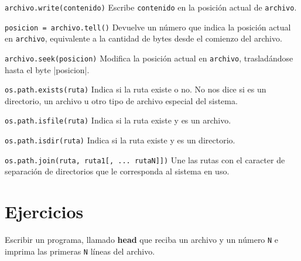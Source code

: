 \begin{referencia_python}
\begin{sintaxis}{\lstinline!archivo.write(contenido)!}
Escribe \lstinline!contenido! en la posición actual de \lstinline!archivo!.
\end{sintaxis}

\begin{sintaxis}{\lstinline!posicion = archivo.tell()!}
Devuelve un número que indica la posición actual en \lstinline!archivo!,
equivalente a la cantidad de bytes desde el comienzo del archivo.
\end{sintaxis}

\begin{sintaxis}{\lstinline!archivo.seek(posicion)!}
Modifica la posición actual en \lstinline!archivo!, trasladándose
hasta el byte |posicion|.
\end{sintaxis}

\begin{sintaxis}{\lstinline!os.path.exists(ruta)!}
Indica si la ruta existe o no.
No nos dice si es un directorio, un archivo u otro tipo de archivo especial
del sistema.
\end{sintaxis}

\begin{sintaxis}{\lstinline!os.path.isfile(ruta)!}
Indica si la ruta existe y es un archivo.
\end{sintaxis}

\begin{sintaxis}{\lstinline!os.path.isdir(ruta)!}
Indica si la ruta existe y es un directorio.
\end{sintaxis}

\begin{sintaxis}{\lstinline!os.path.join(ruta, ruta1[, ... rutaN]])!}
Une las rutas con el caracter de separación de directorios que le corresponda
al sistema en uso.
\end{sintaxis}

\end{referencia_python}

\newpage
\section{Ejercicios}

\begin{ejercicio}
Escribir un programa, llamado {\bf head} que reciba un archivo y un número
\lstinline!N! e imprima las primeras \lstinline!N! líneas del archivo.
\end{ejercicio}

